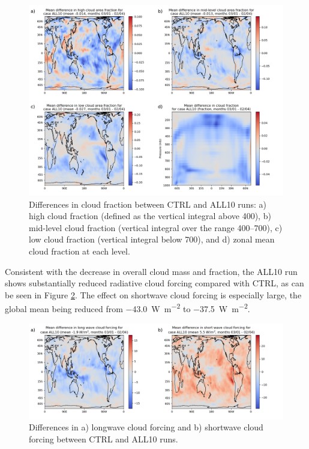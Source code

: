 \documentclass [11pt, proquest] {uwthesis}[2020/02/24]
\begin{document}
\begin{figure}
    \centering
    \includegraphics[width=5.5in]{Figure4.png}
    \caption{Differences in cloud fraction between CTRL and ALL10 runs: a) high cloud fraction (defined as the vertical integral above \SI{400}{\millibar}), b) mid-level cloud fraction (vertical integral over the range \SIrange[range-phrase=--,range-units=single]{400}{700}{\millibar}), c) low cloud fraction (vertical integral below \SI{700}{\millibar}), and d) zonal mean cloud fraction at each level.}
    \label{fig:all10-cld-map}
\end{figure}

Consistent with the decrease in overall cloud mass and fraction, the ALL10 run shows substantially reduced radiative cloud forcing compared with CTRL, as can be seen in Figure \ref{fig:all10-cf-map}. The effect on shortwave cloud forcing is especially large, the global mean being reduced from \SI{-43.0}{\watt\per\meter\squared} to \SI{-37.5}{\watt\per\meter\squared}.

\begin{figure}
    \centering
    \includegraphics[width=5.5in]{Figure5.png}
    \caption{Differences in a) longwave cloud forcing and b) shortwave cloud forcing between CTRL and ALL10 runs.}
    \label{fig:all10-cf-map}
\end{figure}
\end{document}
